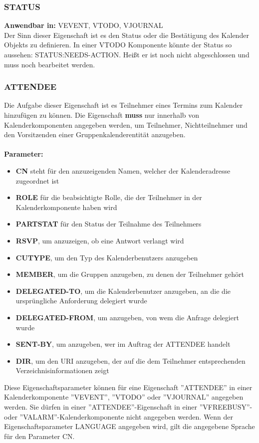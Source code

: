 \subsubsection{STATUS}
\label{sec:status}
\textbf{Anwendbar in:} VEVENT, VTODO, VJOURNAL\\
Der Sinn dieser Eigenschaft ist es den Status oder die Bestätigung des Kalender Objekts zu definieren. In einer VTODO Komponente könnte der Status so aussehen: STATUS:NEEDS-ACTION. Heißt er ist noch nicht abgeschlossen und muss noch bearbeitet werden.
\subsubsection{ATTENDEE}
\label{sec:attendee}
Die Aufgabe dieser Eigenschaft ist es Teilnehmer eines Termins zum Kalender hinzufügen zu können. Die Eigenschaft \textbf{muss} nur innerhalb von Kalenderkomponenten angegeben werden, um Teilnehmer, Nichtteilnehmer und den Vorsitzenden einer Gruppenkalenderentität anzugeben. \\ \\ 
\textbf{Parameter:}
\begin{itemize}
 \item \textbf{CN} steht für den anzuzeigenden Namen, welcher der Kalenderadresse zugeordnet ist
 \item \textbf{ROLE} für die beabsichtigte Rolle, die der Teilnehmer in der Kalenderkomponente haben wird
 \item \textbf{PARTSTAT} für den Status der Teilnahme des Teilnehmers
 \item \textbf{RSVP}, um anzuzeigen, ob eine Antwort verlangt wird
 \item \textbf{CUTYPE}, um den Typ des Kalenderbenutzers anzugeben
 \item \textbf{MEMBER}, um die Gruppen anzugeben, zu denen der Teilnehmer gehört
 \item \textbf{DELEGATED-TO}, um die Kalenderbenutzer anzugeben, an die die ursprüngliche Anforderung delegiert wurde
 \item \textbf{DELEGATED-FROM}, um anzugeben, von wem die Anfrage delegiert wurde
 \item \textbf{SENT-BY}, um anzugeben, wer im Auftrag der ATTENDEE handelt
 \item \textbf{DIR}, um den URI anzugeben, der auf die dem Teilnehmer entsprechenden Verzeichnisinformationen zeigt
 \end{itemize} 
Diese Eigenschaftsparameter können für eine Eigenschaft ''ATTENDEE'' in einer Kalenderkomponente ''VEVENT'', ''VTODO'' oder ''VJOURNAL'' angegeben werden. Sie dürfen in einer ''ATTENDEE''-Eigenschaft in einer ''VFREEBUSY''- oder ''VALARM''-Kalenderkomponente nicht angegeben werden. Wenn der Eigenschaftsparameter LANGUAGE angegeben wird, gilt die angegebene Sprache für den Parameter CN. \\ \\
